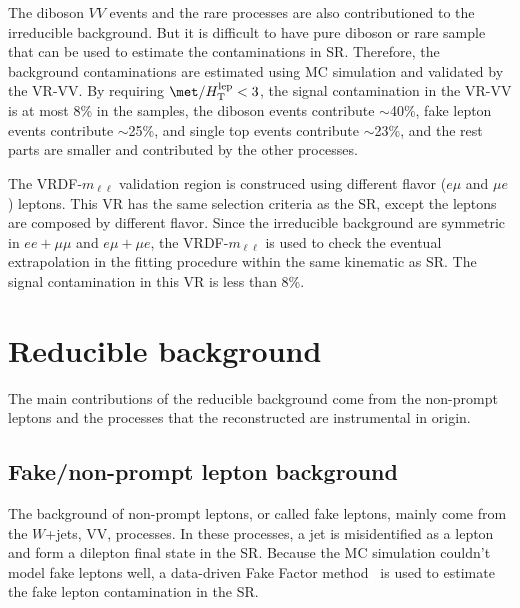 The diboson $VV$ events and the rare processes are also contributioned to the irreducible background.
But it is difficult to have pure diboson or rare sample that can be used to estimate the contaminations in SR.
Therefore, the background contaminations are estimated using MC simulation and validated by the VR-VV.
By requiring $\met/H_\mathrm{T}^\mathrm{lep} < 3$, the signal contamination in the VR-VV is at most 8\% in the samples, the diboson events contribute $\sim$40\%, fake lepton events contribute $\sim$25\%, \ttbar and single top events contribute $\sim$23\%, and the rest parts are smaller and contributed by the other processes.

The VRDF-$m_{\ell \ell}$ validation region is construced using different flavor ($e\mu$ and $\mu e$) leptons.
This VR has the same selection criteria as the SR, except the leptons are composed by different flavor.
Since the irreducible background are symmetric in $ee+\mu\mu$ and $e\mu+\mu e$, the VRDF-$m_{\ell \ell}$ is used to check the eventual extrapolation in the fitting procedure within the same kinematic as SR.
The signal contamination in this VR is less than 8\%.


\section{Reducible background}
\label{sec:bkg_reducible_background}
The main contributions of the reducible background come from the non-prompt leptons and the processes that the reconstructed \met are instrumental in origin.


\subsection{Fake/non-prompt lepton background}
\label{subsec:bkg_fake_lepton_background}
The background of non-prompt leptons, or called fake leptons, mainly come from the $W$+jets, VV, \ttbar processes.
In these processes, a jet is misidentified as a lepton and form a dilepton final state in the SR.
Because the MC simulation couldn't model fake leptons well, a data-driven Fake Factor method~\cite{ATLAS:2014aga} is used to estimate the fake lepton contamination in the SR. 


